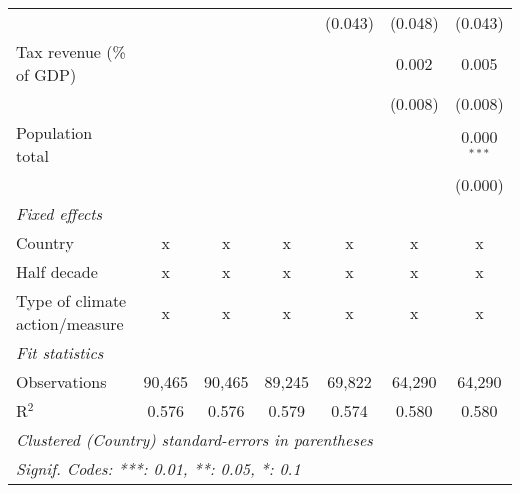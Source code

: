 \begin{tabular}{lcccccc}
                                                       &         &               &               & (0.043)       & (0.048)       & (0.043)\\   
   Tax revenue (\% of GDP)                             &         &               &               &               & 0.002         & 0.005\\   
                                                       &         &               &               &               & (0.008)       & (0.008)\\   
   Population total                                    &         &               &               &               &               & 0.000$^{***}$\\   
                                                       &         &               &               &               &               & (0.000)\\   
   \emph{Fixed effects}\\
   Country                                             & x       & x             & x             & x             & x             & x\\  
   Half decade                                         & x       & x             & x             & x             & x             & x\\  
   Type of climate action/measure                      & x       & x             & x             & x             & x             & x\\  
   \midrule \emph{Fit statistics}\\
   Observations                                        & 90,465  & 90,465        & 89,245        & 69,822        & 64,290        & 64,290\\  
   R$^2$                                               & 0.576   & 0.576         & 0.579         & 0.574         & 0.580         & 0.580\\  
   \midrule
   \multicolumn{7}{l}{\emph{Clustered (Country) standard-errors in parentheses}}\\
   \multicolumn{7}{l}{\emph{Signif. Codes: ***: 0.01, **: 0.05, *: 0.1}}\\
\end{tabular}
\par\endgroup


